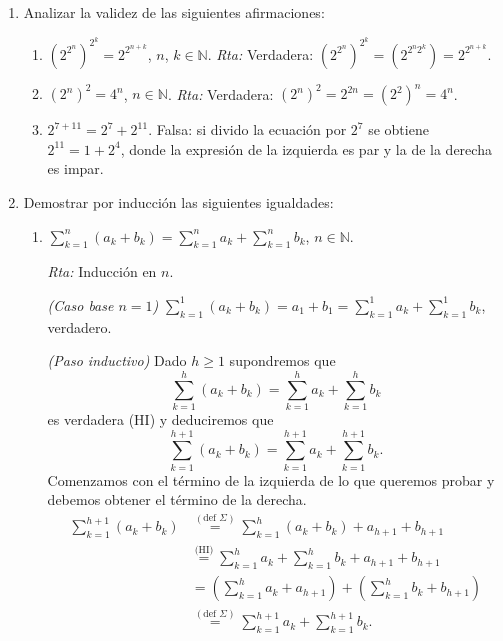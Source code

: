 \documentclass[12pt,spanish,makeidx]{amsbook}
\newcommand{\rta}{\noindent\textit{Rta: }}
\begin{document}
\begin{enumerate}
		
		
		\smallskip
		
		\item Analizar la validez de las siguientes afirmaciones:
		\begin{enumerate}
			\item  $(2^{2^n})^{2^k} = 2^{2^{n+k}}$,  $n$, $k \in {\mathbb N}$. 	\rta  Verdadera: $(2^{2^n})^{2^k} =(2^{2^n2^k}) =  2^{2^{n+k}}$.
			\item $(2^n)^2 = 4^n$, $n \in {\mathbb N}$. \rta  Verdadera: $(2^n)^2 = 2^{2n} =(2^2)^n= 4^n$.
			\item $2^{7+11} = 2^7 + 2^{11}$. Falsa: si divido la ecuación por $2^7$ se obtiene $2^{11} = 1 + 2^{4}$,  donde la expresión de la izquierda es par y la de la derecha es impar. 
		\end{enumerate}
		
		\smallskip
		
		
		\item Demostrar por inducción  las siguientes igualdades:
		\begin{enumerate}
			\item  $\displaystyle{ \sum_{k=1}^n (a_k + b_k) = \sum_{k=1}^n a_k + \sum_{k=1}^n b_k}$, $n\in \mathbb N$.
			
			\rta Inducción en $n$.
			
			\textit{(Caso base $n=1$) }  $\sum_{k=1}^1 (a_k + b_k) = a_1+b_1 = \sum_{k=1}^1 a_k + \sum_{k=1}^1 b_k$, verdadero.
			
			\textit{(Paso inductivo) } Dado $h \ge 1$ supondremos  que 
			$$\sum_{k=1}^h (a_k + b_k) = \sum_{k=1}^h a_k + \sum_{k=1}^h b_k$$ es verdadera (HI) y deduciremos que $$\sum_{k=1}^{h+1} (a_k + b_k) = \sum_{k=1}^{h+1} a_k + \sum_{k=1}^{h+1} b_k.$$
			Comenzamos con el término de la izquierda de lo que queremos probar  y debemos obtener el término de la derecha. 
			\begin{align*}
				\sum_{k=1}^{h+1} (a_k + b_k) &\overset{(\text{def } \Sigma)}{=}  \sum_{k=1}^h (a_k + b_k) + a_{h+1} + b_{h+1}\\ &\overset{\text{(HI)}}{=} \sum_{k=1}^h a_k + \sum_{k=1}^h b_k + a_{h+1} + b_{h+1}
				\\&= ( \sum_{k=1}^h a_k+a_{h+1} ) + ( \sum_{k=1}^h b_k + b_{h+1}) \\&\overset{(\text{def } \Sigma)}{=} \sum_{k=1}^{h+1} a_k + \sum_{k=1}^{h+1} b_k.
			\end{align*}
			

\end{enumerate}
\end{enumerate}
\end{document}
